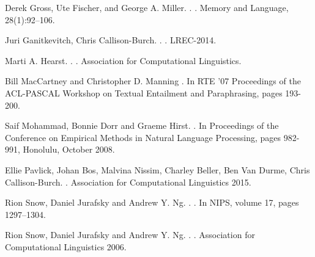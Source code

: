 \documentclass[11pt]{article}
\begin{document}
%
%

\begin{thebibliography}{}

Derek Gross, Ute Fischer, and George A. Miller. .
.
\newblock Memory and Language, 28(1):92–106.

Juri Ganitkevitch, Chris Callison-Burch.
.
.
\newblock LREC-2014.

Marti A. Hearst.
.
.
\newblock Association for Computational Linguistics.

Bill MacCartney and Christopher D. Manning
.
\newblock In RTE '07 Proceedings of the ACL-PASCAL Workshop on Textual Entailment and Paraphrasing, pages 193-200.

Saif Mohammad, Bonnie Dorr and Graeme Hirst.
.
\newblock In Proceedings of the Conference on Empirical Methods in Natural Language Processing, pages 982-991, Honolulu, October 2008.

Ellie Pavlick, Johan Bos, Malvina Nissim, Charley Beller, Ben Van Durme, Chris Callison-Burch.
.
\newblock Association for Computational Linguistics 2015.

Rion Snow, Daniel Jurafsky and Andrew Y. Ng.
.
.
\newblock In NIPS, volume 17, pages 1297–1304.

Rion Snow, Daniel Jurafsky and Andrew Y. Ng.
.
.
\newblock Association for Computational Linguistics 2006.


\end{thebibliography}
\end{document}
